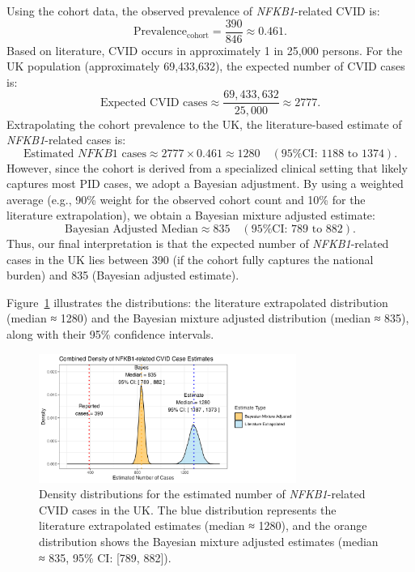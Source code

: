 Using the cohort data, the observed prevalence of \textit{NFKB1}-related CVID is:
\[
\text{Prevalence}_{\text{cohort}} = \frac{390}{846} \approx 0.461.
\]
Based on literature, CVID occurs in approximately 1 in 25,000 persons. For the UK population (approximately 69,433,632), the expected number of CVID cases is:
\[
\text{Expected CVID cases} \approx \frac{69,433,632}{25,000} \approx 2777.
\]
Extrapolating the cohort prevalence to the UK, the literature-based estimate of \textit{NFKB1}-related cases is:
\[
\text{Estimated } NFKB1 \text{ cases} \approx 2777 \times 0.461 \approx 1280 \quad (\text{95\% CI: } 1188 \text{ to } 1374).
\]
However, since the cohort is derived from a specialized clinical setting that likely captures most PID cases, we adopt a Bayesian adjustment. By using a weighted average (e.g., 90\% weight for the observed cohort count and 10\% for the literature extrapolation), we obtain a Bayesian mixture adjusted estimate:
\[
\text{Bayesian Adjusted Median} \approx 835 \quad (\text{95\% CI: } 789 \text{ to } 882).
\]
Thus, our final interpretation is that the expected number of \textit{NFKB1}-related cases in the UK lies between 390 (if the cohort fully captures the national burden) and 835 (Bayesian adjusted estimate).

Figure~\ref{fig:nfkb1_case_est_distribution_combined_mixture} illustrates the distributions: the literature extrapolated distribution (median ≈ 1280) and the Bayesian mixture adjusted distribution (median ≈ 835), along with their 95\% confidence intervals.

\begin{figure}[ht]
  \centering
  \includegraphics[width=0.75\textwidth]{../images/nfkb1_case_est_distribution_combined_mixture.png}
  \caption{Density distributions for the estimated number of \textit{NFKB1}-related CVID cases in the UK. The blue distribution represents the literature extrapolated estimates (median ≈ 1280), and the orange distribution shows the Bayesian mixture adjusted estimates (median ≈ 835, 95\% CI: [789, 882]).}
  \label{fig:nfkb1_case_est_distribution_combined_mixture}
\end{figure}

